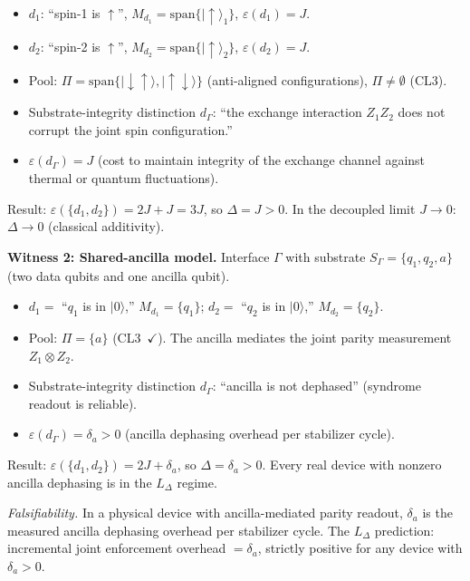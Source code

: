 \documentclass[11pt]{article}
\theoremstyle{remark}
\begin{document}
\begin{itemize}[nosep,leftmargin=2em,itemsep=2pt]
  \item $d_1$: ``spin-1 is $\uparrow$'', $M_{d_1} = \mathrm{span}\{|\!\uparrow\rangle_1\}$, $\varepsilon(d_1) = J$.
  \item $d_2$: ``spin-2 is $\uparrow$'', $M_{d_2} = \mathrm{span}\{|\!\uparrow\rangle_2\}$, $\varepsilon(d_2) = J$.
  \item Pool: $\Pi = \mathrm{span}\{|\!\downarrow\!\uparrow\rangle, |\!\uparrow\!\downarrow\rangle\}$ (anti-aligned configurations), $\Pi \ne \emptyset$ (CL3).
  \item Substrate-integrity distinction $d_\Gamma$: ``the exchange interaction $Z_1 Z_2$ does not corrupt the joint spin configuration.''
  \item $\varepsilon(d_\Gamma) = J$ (cost to maintain integrity of the exchange channel against thermal or quantum fluctuations).
\end{itemize}
Result: $\varepsilon(\{d_1, d_2\}) = 2J + J = 3J$, so $\Delta = J > 0$.  In the decoupled limit $J \to 0$: $\Delta \to 0$ (classical additivity).

\medskip\noindent\textbf{Witness 2: Shared-ancilla model.}  Interface $\Gamma$ with substrate $S_\Gamma = \{q_1, q_2, a\}$ (two data qubits and one ancilla qubit).

\begin{itemize}[nosep,leftmargin=2em,itemsep=2pt]
  \item $d_1 = $ ``$q_1$ is in $|0\rangle$,'' $M_{d_1} = \{q_1\}$; \quad $d_2 = $ ``$q_2$ is in $|0\rangle$,'' $M_{d_2} = \{q_2\}$.
  \item Pool: $\Pi = \{a\}$ (CL3~$\checkmark$).  The ancilla mediates the joint parity measurement $Z_1 \otimes Z_2$.
  \item Substrate-integrity distinction $d_\Gamma$: ``ancilla is not dephased'' (syndrome readout is reliable).
  \item $\varepsilon(d_\Gamma) = \delta_a > 0$ (ancilla dephasing overhead per stabilizer cycle).
\end{itemize}
Result: $\varepsilon(\{d_1, d_2\}) = 2J + \delta_a$, so $\Delta = \delta_a > 0$.  Every real device with nonzero ancilla dephasing is in the $L_\Delta$ regime.

\smallskip\noindent\textit{Falsifiability.}  In a physical device with ancilla-mediated parity readout, $\delta_a$ is the measured ancilla dephasing overhead per stabilizer cycle.  The $L_\Delta$ prediction: incremental joint enforcement overhead $= \delta_a$, strictly positive for any device with $\delta_a > 0$.
\end{document}
